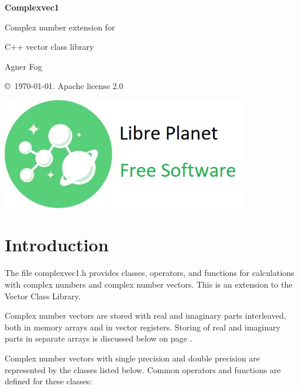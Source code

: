\documentclass[11pt,a4paper,oneside,openright]{report}
\newcommand{\vspacesmall}{\vspace{3mm}}
\newcommand{\vspacebig}{\vspace{6mm}}
\begin{document}
\begin{titlepage}
    \centering
   
    \null %
    \vfill

   {\bfseries\Huge
    Complexvec1
    \vspacesmall
    
    Complex number extension for 
    \vspacesmall
        
    C++ vector class library 
    \vspacebig
        
   }        
    \vspacebig
    
   {\Large    
    Agner Fog
    \vspacebig
    
    \copyright\ \today. Apache license 2.0
   }
    
    \vfill
    
    \includegraphics[width=306pt]{freesoftwarelogo.jpg}
    \vfill
    
\end{titlepage}

\RaggedRight

\chapter{Introduction}\label{chap:Introduction}

The file complexvec1.h provides classes, operators, and functions for 
calculations with complex numbers and complex number vectors.
This is an extension to the Vector Class Library.
\vspacesmall

Complex number vectors are stored with real and imaginary parts interleaved, both in memory arrays and in vector registers. Storing of real and imaginary parts in separate arrays is discussed below on page \pageref{chap:InterleavedVsSeparate}.
\vspacesmall

Complex number vectors with single precision and double precision are represented by the classes listed below. Common operators and functions are defined for these classes:
\end{document}
